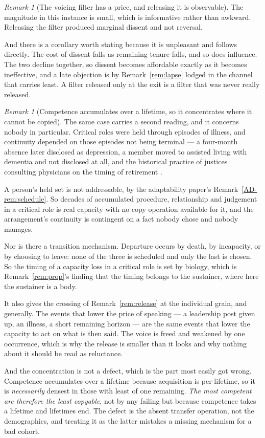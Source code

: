 \documentclass[11pt,a4paper]{article}
\theoremstyle{remark}
\newtheorem{remark}[definition]{Remark}
\begin{document}
\begin{remark}[The voicing filter has a price, and releasing it is observable]
The magnitude in this instance is small, which is informative rather than awkward. Releasing the
filter produced marginal dissent and not reversal.

And there is a corollary worth stating because it is unpleasant and follows directly. The cost of
dissent falls as remaining tenure falls, and so does influence. The two decline together, so
dissent becomes affordable exactly as it becomes ineffective, and a late objection is by
Remark~\ref{rem:lapse} lodged in the channel that carries least. A filter released only at the exit
is a filter that was never really released.
\end{remark}

\begin{remark}[Competence accumulates over a lifetime, so it concentrates where it cannot be copied]\label{rem:actuarial}
The same case carries a second reading, and it concerns nobody in particular. Critical roles were
held through episodes of illness, and continuity depended on those episodes not being terminal --- a
four-month absence later disclosed as depression, a member moved to assisted living with dementia and
not disclosed at all, and the historical practice of justices consulting physicians on the timing of
retirement \citep{health2026}.

A person's held set is not addressable, by the adaptability paper's Remark~\ref{AD-rem:schedule}. So decades of accumulated
procedure, relationship and judgement in a critical role is real capacity with no copy operation
available for it, and the arrangement's continuity is contingent on a fact nobody chose and nobody
manages.

Nor is there a transition mechanism. Departure occurs by death, by incapacity, or by choosing to
leave: none of the three is scheduled and only the last is chosen. So the timing of a capacity
loss in a critical role is set by biology, which is Remark~\ref{rem:prop}'s finding that the timing
belongs to the sustainer, where here the sustainer is a body.

It also gives the crossing of Remark~\ref{rem:release} at the individual grain, and generally. The
events that lower the price of speaking --- a leadership post given up, an illness, a short remaining
horizon --- are the same events that lower the capacity to act on what is then said. The voice is
freed and weakened by one occurrence, which is why the release is smaller than it looks and why nothing
about it should be read as reluctance.

And the concentration is not a defect, which is the part most easily got wrong. Competence
accumulates over a lifetime because acquisition is per-lifetime, so it is \emph{necessarily} densest in
those with least of one remaining. \emph{The most competent are therefore the least copyable}, not by any
failing but because competence takes a lifetime and lifetimes end. The defect is the absent
transfer operation, not the demographics, and treating it as the latter mistakes a missing mechanism
for a bad cohort.


\end{remark}
\end{document}
